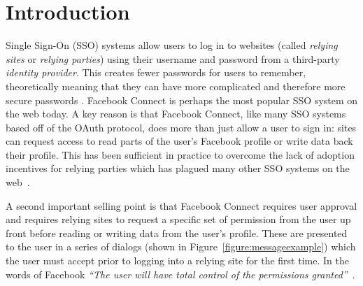 \documentclass[10pt]{sig-alternate-10pt}
\begin{document}
\section{Introduction}
Single Sign-On (SSO) systems allow users to log in to websites (called \textit{relying sites} or \textit{relying parties}) using their username and password from a third-party \textit{identity provider}.
This creates fewer passwords for users to remember, theoretically meaning that they can have more complicated and therefore more secure passwords \cite{openidsecurity}.
Facebook Connect is perhaps the most popular SSO system on the web today.
A key reason is that Facebook Connect, like many SSO systems based off of the OAuth protocol, does more than just allow a user to sign in: sites can request access to read parts of the user's Facebook profile or write data back their profile.
This has been sufficient in practice to overcome the lack of adoption incentives for relying parties which has plagued many other SSO systems on the web~\cite{sun10}.

A second important selling point is that Facebook Connect requires user approval and requires relying sites to request a specific set of permission from the user up front before reading or writing data from the user's profile.
These are presented to the user in a series of dialogs (shown in Figure~\ref{figure:messageexample}) which the user must accept prior to logging into a relying site for the first time.
In the words of Facebook \textit{``The user will have total control of the permissions granted''}~\cite{fb-connect-announce}.

\end{document}
